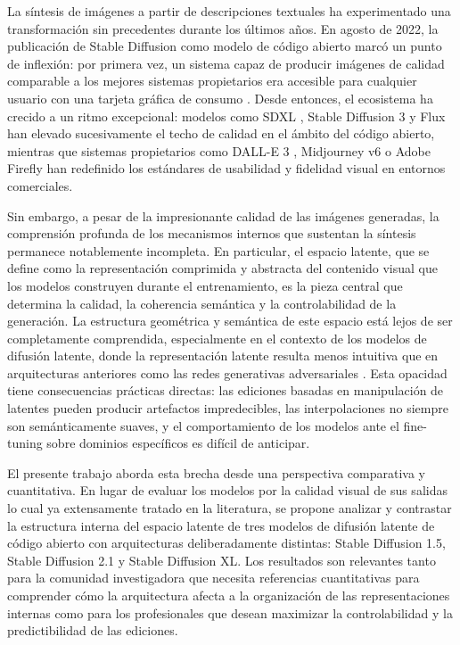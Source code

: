 \documentclass[12pt, a4paper, twoside]{book}
\begin{document}
La síntesis de imágenes a partir de descripciones textuales ha experimentado una transformación sin precedentes durante los últimos años. En agosto de 2022, la publicación de Stable Diffusion como modelo de código abierto marcó un punto de inflexión: por primera vez, un sistema capaz de producir imágenes de calidad comparable a los mejores sistemas propietarios era accesible para cualquier usuario con una tarjeta gráfica de consumo \citep{rombach2022ldm}. Desde entonces, el ecosistema ha crecido a un ritmo excepcional: modelos como SDXL \citep{podell2023sdxl}, Stable Diffusion 3 \citep{esser2024sd3} y Flux \citep{bfl2024flux} han elevado sucesivamente el techo de calidad en el ámbito del código abierto, mientras que sistemas propietarios como DALL-E 3 \citep{betker2023dalle3}, Midjourney v6 o Adobe Firefly han redefinido los estándares de usabilidad y fidelidad visual en entornos comerciales.

Sin embargo, a pesar de la impresionante calidad de las imágenes generadas, la comprensión profunda de los mecanismos internos que sustentan la síntesis permanece notablemente incompleta. En particular, el espacio latente, que se define como la representación comprimida y abstracta del contenido visual que los modelos construyen durante el entrenamiento, es la pieza central que determina la calidad, la coherencia semántica y la controlabilidad de la generación. La estructura geométrica y semántica de este espacio está lejos de ser completamente comprendida, especialmente en el contexto de los modelos de difusión latente, donde la representación latente resulta menos intuitiva que en arquitecturas anteriores como las redes generativas adversariales \citep{kwon2023diffusion}. Esta opacidad tiene consecuencias prácticas directas: las ediciones basadas en manipulación de latentes pueden producir artefactos impredecibles, las interpolaciones no siempre son semánticamente suaves, y el comportamiento de los modelos ante el fine-tuning sobre dominios específicos es difícil de anticipar.

El presente trabajo aborda esta brecha desde una perspectiva comparativa y cuantitativa. En lugar de evaluar los modelos por la calidad visual de sus salidas lo cual ya extensamente tratado en la literatura, se propone analizar y contrastar la estructura interna del espacio latente de tres modelos de difusión latente de código abierto con arquitecturas deliberadamente distintas: Stable Diffusion 1.5, Stable Diffusion 2.1 y Stable Diffusion XL. Los resultados son relevantes tanto para la comunidad investigadora que necesita referencias cuantitativas para comprender cómo la arquitectura afecta a la organización de las representaciones internas como para los profesionales que desean maximizar la controlabilidad y la predictibilidad de las ediciones.
\end{document}
